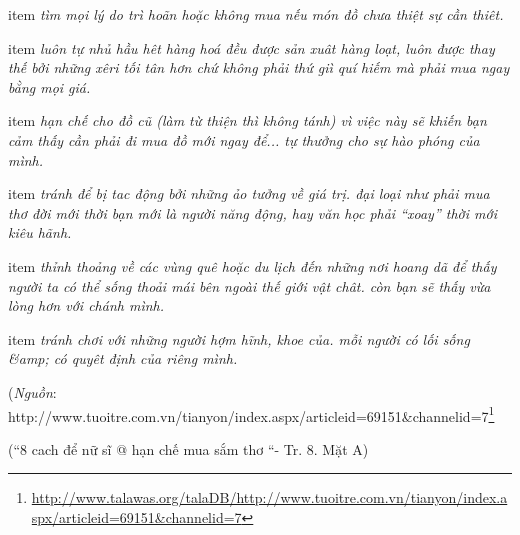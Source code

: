 \documentclass[../main.tex]{subfiles}
\begin{document}
\begin{multicols}{2}
\begin{blockquote}
\begin{blockquote}
\begin{enumerate}
item{
\textit{tìm mọi lý do trì hoãn hoặc không mua nếu món đồ chưa thiệt sự cần thiêt. } 
 }

item{
\textit{luôn tự nhủ hầu hêt hàng hoá đều được sản xuât hàng loạt, luôn được thay thế bởi những xêri tối tân hơn chứ không phải thứ giì quí hiếm mà phải mua ngay bằng mọi giá. } 
 }

item{
\textit{hạn chế cho đồ cũ (làm từ thiện thì không tánh) vì việc này sẽ khiến bạn cảm thấy cần phải đi mua đồ mới ngay để... tự thưởng cho sự hào phóng của mình. } 
 }

item{
\textit{tránh để bị tac động bởi những ảo tưởng về giá trị. đại loại như phải mua thơ đời mới thời bạn mới là người năng động, hay văn học phải “xoay” thời mới kiêu hãnh. } 
 }

item{
\textit{thỉnh thoảng về các vùng quê hoặc du lịch đến những nơi hoang dã để thấy người ta có thể sống thoải mái bên ngoài thế giới vật chât. còn bạn sẽ thấy vừa lòng hơn với chánh mình. } 
 }

item{
\textit{tránh chơi với những người hợm hĩnh, khoe của. mỗi người có lối sống &amp; có quyêt định của riêng mình. } }

\end{enumerate}
     
(\textit{Nguồn}: http://www.tuoitre.com.vn/tianyon/index.aspx/articleid=69151&channelid=7\footnote{\url{http://www.talawas.org/talaDB/http://www.tuoitre.com.vn/tianyon/index.aspx/articleid=69151&channelid=7}} 
                            
(“8 cach để nữ sĩ @ hạn chế mua sắm thơ “- Tr. 8. Mặt A) 

\end{blockquote}
 

\end{blockquote}
\end{multicols}
\end{document}
